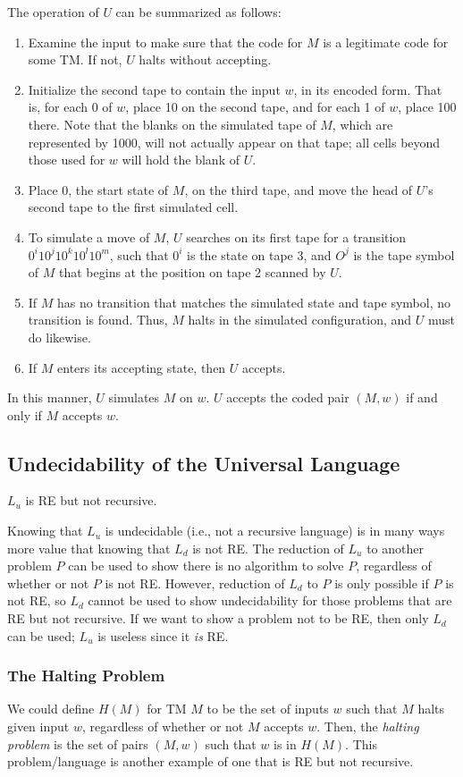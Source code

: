 \documentclass[]{article}
\begin{document}
The operation of $U$ can be summarized as follows:
\begin{enumerate}
\item Examine the input to make sure that the code for $M$ is a legitimate code
for some TM. If not, $U$ halts without accepting.
\item Initialize the second tape to contain the input $w$, in its encoded form.
That is, for each $0$ of $w$, place 10 on the second tape, and for each 1 of
$w$, place 100 there. Note that the blanks on the simulated tape of $M$, which
are represented by 1000, will not actually appear on that tape; all cells beyond
those used for $w$ will hold the blank of $U$.
\item Place 0, the start state of $M$, on the third tape, and move the head of
$U$'s second tape to the first simulated cell.
\item To simulate a move of $M$, $U$ searches on its first tape for a transition
$0^i10^j10^k10^l10^m$, such that $0^i$ is the state on tape 3, and $O^j$ is the
tape symbol of $M$ that begins at the position on tape 2 scanned by $U$.
\item If $M$ has no transition that matches the simulated state and tape symbol,
no transition is found. Thus, $M$ halts in the simulated configuration, and $U$
must do likewise.
\item If $M$ enters its accepting state, then $U$ accepts.
\end{enumerate}
In this manner, $U$ simulates $M$ on $w$. $U$ accepts the coded pair $(M, w)$ if
and only if $M$ accepts $w$.

\subsection*{Undecidability of the Universal Language}
\begin{thm}
$L_u$ is RE but not recursive.
\end{thm}
Knowing that $L_u$ is undecidable (i.e., not a recursive language) is in many
ways more value that knowing that $L_d$ is not RE. The reduction of $L_u$ to
another problem $P$ can be used to show there is no algorithm to solve $P$,
regardless of whether or not $P$ is not RE. However, reduction of $L_d$ to $P$
is only possible if $P$ is not RE, so $L_d$ cannot be used to show
undecidability for those problems that are RE but not recursive. If we want to
show a problem not to be RE, then only $L_d$ can be used; $L_u$ is useless since
it \emph{is} RE.

\subsubsection*{The Halting Problem}
We could define $H(M)$ for TM $M$ to be the set of inputs $w$ such that $M$
halts given input $w$, regardless of whether or not $M$ accepts $w$. Then, the
\emph{halting problem} is the set of pairs $(M, w)$ such that $w$ is in $H(M)$.
This problem/language is another example of one that is RE but not recursive.
\end{document}
